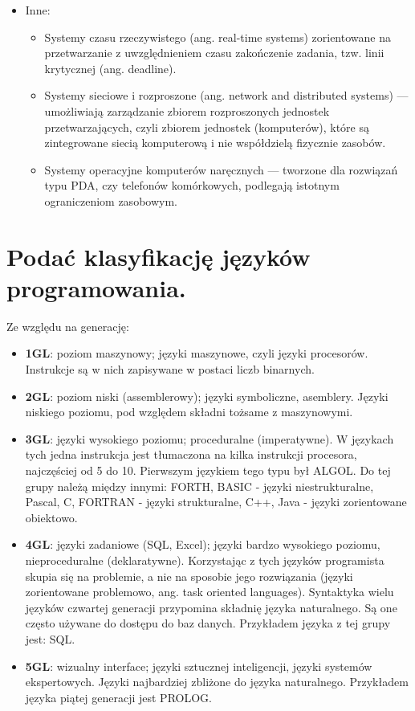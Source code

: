 \documentclass[12pt,a4paper]{article}
\begin{document}
\begin{itemize}
		\item Inne:
		\begin{itemize}
			\item Systemy czasu rzeczywistego (ang. real-time systems) zorientowane na przetwarzanie z uwzględnieniem czasu zakończenie zadania, tzw. linii krytycznej (ang. deadline).
			\item Systemy sieciowe i rozproszone (ang. network and distributed systems) — umożliwiają zarządzanie zbiorem rozproszonych jednostek przetwarzających, czyli zbiorem jednostek (komputerów), które są zintegrowane siecią komputerową i nie współdzielą fizycznie zasobów.
			\item Systemy operacyjne komputerów naręcznych — tworzone dla rozwiązań typu PDA, czy telefonów komórkowych, podlegają istotnym ograniczeniom zasobowym.
		\end{itemize}
	\end{itemize}

	\section{Podać klasyfikację języków programowania.}
	Ze względu na generację:	
	\begin{itemize}
		\item \textbf{1GL}: poziom maszynowy; języki maszynowe, czyli języki procesorów. Instrukcje są w nich zapisywane w postaci liczb binarnych. 
		\item \textbf{2GL}: poziom niski (assemblerowy); języki symboliczne, asemblery. Języki niskiego poziomu, pod względem składni tożsame z maszynowymi.
		\item \textbf{3GL}: języki wysokiego poziomu; proceduralne (imperatywne). W językach tych jedna instrukcja jest tłumaczona na kilka instrukcji procesora, najczęściej od 5 do 10. Pierwszym językiem tego typu był ALGOL. Do tej grupy należą między innymi: FORTH, BASIC - języki niestrukturalne, Pascal, C, FORTRAN - języki strukturalne, C++, Java - języki zorientowane obiektowo. 
		\item \textbf{4GL}: języki zadaniowe (SQL, Excel);  języki bardzo wysokiego poziomu, nieproceduralne (deklaratywne). Korzystając z tych języków programista skupia się na problemie, a nie na sposobie jego rozwiązania (języki zorientowane problemowo, ang. task oriented languages). Syntaktyka wielu języków czwartej generacji przypomina składnię języka naturalnego. Są one często używane do dostępu do baz danych. Przykładem języka z tej grupy jest: SQL. 
		\item \textbf{5GL}: wizualny interface;  języki sztucznej inteligencji, języki systemów ekspertowych. Języki najbardziej zbliżone do języka naturalnego. Przykładem języka piątej generacji jest PROLOG.
	\end{itemize}
\end{document}
